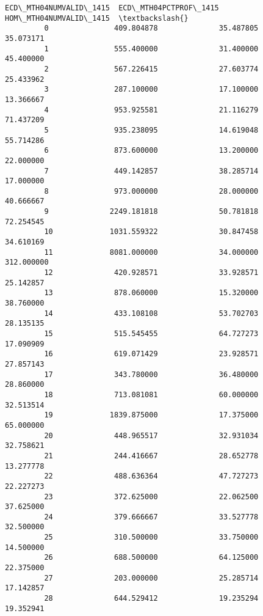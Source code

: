 \documentclass[11pt]{article}
\begin{document}
\begin{Verbatim}[commandchars=\\\{\}]
             ECD\_MTH04NUMVALID\_1415  ECD\_MTH04PCTPROF\_1415  HOM\_MTH04NUMVALID\_1415  \textbackslash{}
         0               409.804878              35.487805               35.073171   
         1               555.400000              31.400000               45.400000   
         2               567.226415              27.603774               25.433962   
         3               287.100000              17.100000               13.366667   
         4               953.925581              21.116279               71.437209   
         5               935.238095              14.619048               55.714286   
         6               873.600000              13.200000               22.000000   
         7               449.142857              38.285714               17.000000   
         8               973.000000              28.000000               40.666667   
         9              2249.181818              50.781818               72.254545   
         10             1031.559322              30.847458               34.610169   
         11             8081.000000              34.000000              312.000000   
         12              420.928571              33.928571               25.142857   
         13              878.060000              15.320000               38.760000   
         14              433.108108              53.702703               28.135135   
         15              515.545455              64.727273               17.090909   
         16              619.071429              23.928571               27.857143   
         17              343.780000              36.480000               28.860000   
         18              713.081081              60.000000               32.513514   
         19             1839.875000              17.375000               65.000000   
         20              448.965517              32.931034               32.758621   
         21              244.416667              28.652778               13.277778   
         22              488.636364              47.727273               22.227273   
         23              372.625000              22.062500               37.625000   
         24              379.666667              33.527778               32.500000   
         25              310.500000              33.750000               14.500000   
         26              688.500000              64.125000               22.375000   
         27              203.000000              25.285714               17.142857   
         28              644.529412              19.235294               19.352941   

\end{Verbatim}
\end{document}
